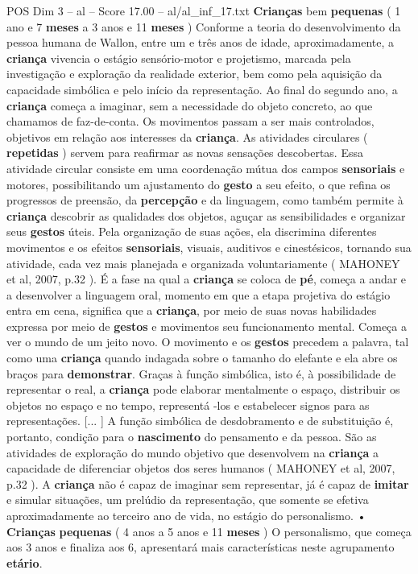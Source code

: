\begin{textsample}{POS Dim 3 – al – Score 17.00 – al/al\_inf\_17.txt}  \label{ex:f3_pos_218}
\textbf{Crianças} bem \textbf{pequenas} ( 1 ano e 7 \textbf{meses} a 3 anos e 11 \textbf{meses} ) Conforme a teoria do desenvolvimento da pessoa humana de Wallon, entre um e três anos de idade, aproximadamente, a \textbf{criança} vivencia o estágio sensório-motor e projetismo, marcada pela investigação e exploração da realidade exterior, bem como pela aquisição da capacidade simbólica e pelo início da representação.
Ao final do segundo ano, a \textbf{criança} começa a imaginar, sem a necessidade do objeto concreto, ao que chamamos de faz-de-conta.
Os movimentos passam a ser mais controlados, objetivos em relação aos interesses da \textbf{criança}.
As atividades circulares ( \textbf{repetidas} ) servem para reafirmar as novas sensações descobertas.
Essa atividade circular consiste em uma coordenação mútua dos campos \textbf{sensoriais} e motores, possibilitando um ajustamento do \textbf{gesto} a seu efeito, o que refina os progressos de preensão, da \textbf{percepção} e da linguagem, como também permite à \textbf{criança} descobrir as qualidades dos objetos, aguçar as sensibilidades e organizar seus \textbf{gestos} úteis.
Pela organização de suas ações, ela discrimina diferentes movimentos e os efeitos \textbf{sensoriais}, visuais, auditivos e cinestésicos, tornando sua atividade, cada vez mais planejada e organizada voluntariamente ( MAHONEY et al, 2007, p.32 ).
É a fase na qual a \textbf{criança} se coloca de \textbf{pé}, começa a andar e a desenvolver a linguagem oral, momento em que a etapa projetiva do estágio entra em cena, significa que a \textbf{criança}, por meio de suas novas habilidades expressa por meio de \textbf{gestos} e movimentos seu funcionamento mental.
Começa a ver o mundo de um jeito novo.
O movimento e os \textbf{gestos} precedem a palavra, tal como uma \textbf{criança} quando indagada sobre o tamanho do elefante e ela abre os braços para \textbf{demonstrar}.
Graças à função simbólica, isto é, à possibilidade de representar o real, a \textbf{criança} pode elaborar mentalmente o espaço, distribuir os objetos no espaço e no tempo, representá -los e estabelecer signos para as representações. [... ] A função simbólica de desdobramento e de substituição é, portanto, condição para o \textbf{nascimento} do pensamento e da pessoa.
São as atividades de exploração do mundo objetivo que desenvolvem na \textbf{criança} a capacidade de diferenciar objetos dos seres humanos ( MAHONEY et al, 2007, p.32 ).
A \textbf{criança} não é capaz de imaginar sem representar, já é capaz de \textbf{imitar} e simular situações, um prelúdio da representação, que somente se efetiva aproximadamente ao terceiro ano de vida, no estágio do personalismo. • \textbf{Crianças} \textbf{pequenas} ( 4 anos a 5 anos e 11 \textbf{meses} ) O personalismo, que começa aos 3 anos e finaliza aos 6, apresentará mais características neste agrupamento \textbf{etário}.

\end{textsample}

